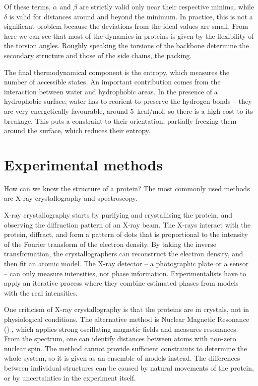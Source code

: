 Of these terms, $\alpha$ and $\beta$ are strictly valid only near their respective minima, while $\delta$ is valid for distances around and beyond the minimum.
In practice, this is not a significant problem because the deviations from the ideal values are small. 
From here we can see that most of the dynamics in proteins is given by the flexibility of the torsion angles.
Roughly speaking the torsions of the backbone determine the secondary structure and those of the side chains, the packing.

The final thermodynamical component is the entropy,  which measures the number of accessible states.
An important contribution comes from the interaction between water and hydrophobic areas.
In the presence of a hydrophobic surface, water has to reorient to preserve the hydrogen bonds -- they are very energetically favourable, around \SI{5}{kcal/mol}, so there is a high cost to its breakage.
This puts a constraint to their orientation, partially freezing them around the surface, which reduces their entropy.

\section{Experimental methods}
How can we know the structure of a protein?
The most commonly used methods are X-ray crystallography and \NMR{} spectroscopy.


X-ray crystallography starts by
purifying and crystallising the protein, and observing the diffraction pattern of an X-ray beam.
The X-rays interact with the protein, diffract, and form a pattern of dots that is proportional to the intensity of the Fourier transform of the electron density.
By taking the inverse transformation, the crystallographers can reconstruct the electron density, and then fit an atomic model.
The X-ray detector -- a photographic plate or a \CCD{} sensor -- can only measure intensities, not phase information.
Experimentalists have to apply an iterative process where they combine estimated phases from models with the real intensities.

One criticism of X-ray crystallography is that the proteins are in crystals, not in physiological conditions.
The alternative method is Nuclear Magnetic Resonance (\NMR) \citep{nmr}, \marginpar{\NMR} which applies strong oscillating magnetic fields and measures resonances.
From the spectrum, one can identify distances between atoms with non-zero nuclear spin.
The method cannot provide sufficient constraints to determine the whole system, so it is given as an ensemble of models instead.
The differences between individual structures can be caused by natural movements of the protein, or by uncertainties in the experiment itself.

